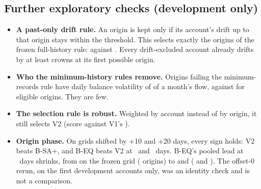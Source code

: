 \begin{table}[t]
\centering\footnotesize
{}
\caption{Synthetic panel:  seeds per generator,
 origins per method and horizon. Pooled
coverage (\%) and account(seed)-mean skill against B-SA+. V2's sparse rule
never fired, so V2 equals V0. V3 was not run on synthetic data.}
\label{tab:synthetic}
\end{table}


\begin{table}[htbp]
\centering\footnotesize
{}
\caption{Claim A1: V0's pooled coverage (\%) on model-matched data with the
protocol of the engine's earlier calibration test ( seeds,
three origins each). The numbers reproduce that test's output exactly.}
\label{tab:a1}
\end{table}

\subsection{Further exploratory checks (development only)}
\begin{itemize}
\item \textbf{A past-only drift rule.} An origin is kept only if its
  account's drift up to that origin stays within the threshold. This
  selects exactly the origins of the frozen full-history rule:
   against . Every drift-excluded
  account already drifts by at least 
  crowns at its first possible origin.
\item \textbf{Who the minimum-history rules remove.} Origins failing the
  minimum-records rule have daily balance volatility of
  of a month's flow, against
   for eligible
  origins. They are few.
\item \textbf{The selection rule is robust.} Weighted by account instead of
  by origin, it still selects V2 (score 
  against V1's ).
\item \textbf{Origin phase.} On grids shifted by +10 and +20 days, every
  sign holds: V2 beats B-SA+, and B-EQ beats V2 at \hB\ and \hC\ days.
  B-EQ's pooled lead at \hB\ days shrinks, from
   on the frozen grid
  ( origins) to
   and
  ( and
  ). The offset-0 rerun, on the
  first  development accounts only,
  was an identity check and is not a comparison.
\end{itemize}

